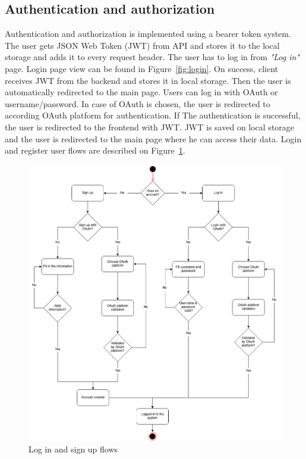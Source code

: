 \subsection{Authentication and authorization}\label{subsec:authentication-and-authorization}
Authentication and authorization is implemented using a bearer token system.
The user gets JSON Web Token (JWT) from API and stores it to the local storage and adds it to every request header.
The user has to log in from \textit{"Log in"} page.
Login page view can be found in Figure~\ref{fig:login}.
On success, client receives JWT from the backend and stores it in local storage.
Then the user is automatically redirected to the main page.
Users can log in with OAuth or username/password.
In case of OAuth is chosen, the user is redirected to according OAuth platform for authentication.
If The authentication is successful, the user is redirected to the frontend with JWT.
JWT is saved on local storage and the user is redirected to the main page where he can access their data.
Login and register user flows are described on Figure~\ref{fig:login-signup-diagram}.

\begin{figure}[H]
    \includegraphics[width=\textwidth]{figures/login_signup_user_flow}
    \caption{Log in and sign up flows}
    \label{fig:login-signup-diagram}
\end{figure}

